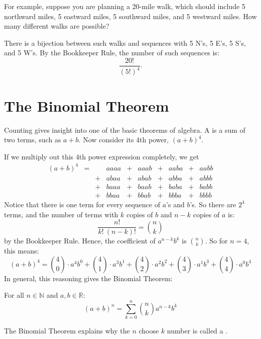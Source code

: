 For example, suppose you are planning a 20-mile walk, which should
include 5 northward miles, 5 eastward miles, 5 southward miles, and 5
westward miles.  How many different walks are possible?

There is a bijection between such walks and sequences with 5 N's, 5
E's, 5 S's, and 5 W's.  By the Bookkeeper Rule, the number of such
sequences is:
\[
    \frac{20!}{(5!)^4}.
\]

\begin{problems}
\practiceproblems
{}
\examproblems
{}
\end{problems}


\section{The Binomial Theorem}\label{binomial_theorem_sec}

Counting gives insight into one of the basic theorems of algebra.  A
 is a sum of two terms, such as $a + b$.  Now consider its
4th power, $(a + b)^4$.

If we multiply out this 4th power expression completely, we get
\[\begin{array}{rccccccccc}
(a + b)^4
   & = &    & aaaa & + & aaab & + & aaba & + & aabb \\
   &   &  + & abaa & + & abab & + & abba & + & abbb \\
   &   &  + & baaa & + & baab & + & baba & + & babb \\
   &   &  + & bbaa & + & bbab & + & bbba & + & bbbb
\end{array}\]
Notice that there is one term for every sequence of $a$'s and $b$'s.  So
there are $2^4$ terms, and the number of terms with $k$ copies of $b$ and
$n - k$ copies of $a$ is:
\[
\frac{n!}{k!\ (n-k)!} = \binom{n}{k}
\]
by the Bookkeeper Rule.  Hence, the coefficient of $a^{n-k} b^k$ is
$\binom{n}{k}$.  So for $n = 4$, this means:
\[
(a + b)^4 =
    \binom{4}{0} \cdot a^4 b^0 +
    \binom{4}{1} \cdot a^3 b^1 +
    \binom{4}{2} \cdot a^2 b^2 +
    \binom{4}{3} \cdot a^1 b^3 +
    \binom{4}{4} \cdot a^0 b^4
\]
In general, this reasoning gives the Binomial Theorem:

\begin{theorem}
For all $n \in \mathbb{N}$ and $a, b \in \mathbb{R}$:
%
\[
(a + b)^n = \sum_{k=0}^n \binom{n}{k} a^{n-k} b^k
\]
\end{theorem}
The Binomial Theorem explains why the $n$ choose $k$ number is called
a .

